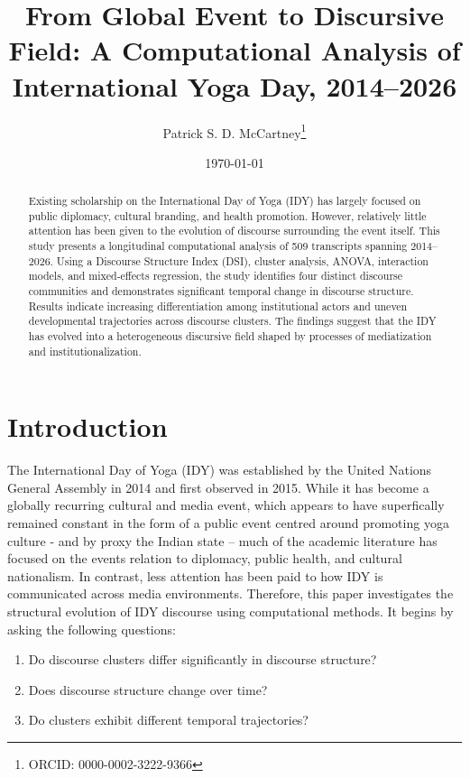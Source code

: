 \documentclass[11pt]{article}
\title{From Global Event to Discursive Field: A Computational Analysis of International Yoga Day, 2014--2026}
\author[1]{Patrick S. D. McCartney\thanks{ORCID: 0000-0002-3222-9366}}
\affil[1]{Nanzan University Anthropological Institute}
\affil[2]{Australian National University}
\affil[3]{Manipal Academy of Higher Education}
\date{\today}
\begin{document}
\maketitle



\begin{abstract}



Existing scholarship on the International Day of Yoga (IDY) has largely focused on public diplomacy, cultural branding,
and health promotion. However, relatively little attention has been given to the evolution of discourse surrounding the
event itself. This study presents a longitudinal computational analysis of 509 transcripts spanning 2014--2026. Using a
Discourse Structure Index (DSI), cluster analysis, ANOVA, interaction models, and mixed-effects regression, the study
identifies four distinct discourse communities and demonstrates significant temporal change in discourse structure.
Results indicate increasing differentiation among institutional actors and uneven developmental trajectories across
discourse clusters. The findings suggest that the IDY has evolved into a heterogeneous discursive field shaped by
processes of mediatization and institutionalization.


\end{abstract}



\section{Introduction}



The International Day of Yoga (IDY) was established by the United Nations General Assembly in 2014 and first observed in
2015. While it has become a globally recurring cultural and media event, which appears to have superfically remained
constant in the form of a public event centred around promoting yoga culture - and by proxy the Indian state – much of
the academic literature has focused on the events relation to diplomacy, public health, and cultural nationalism. In
contrast, less attention has been paid to how IDY is communicated across media environments. Therefore, this paper
investigates the structural evolution of IDY discourse using computational methods. It begins by asking the following
questions:


\begin{enumerate}

\item Do discourse clusters differ significantly in discourse structure?

\item Does discourse structure change over time?

\item Do clusters exhibit different temporal trajectories?

\end{enumerate}
\end{document}
